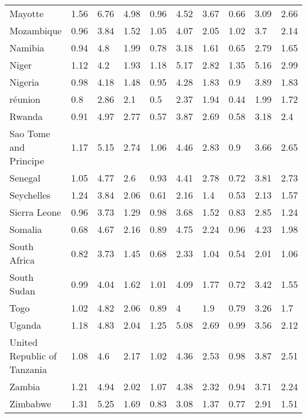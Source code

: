 \begin{longtable}[t]{llllllllll}
Mayotte & 1.56 & 6.76 & 4.98 & 0.96 & 4.52 & 3.67 & 0.66 & 3.09 & 2.66\\
Mozambique & 0.96 & 3.84 & 1.52 & 1.05 & 4.07 & 2.05 & 1.02 & 3.7 & 2.14\\
Namibia & 0.94 & 4.8 & 1.99 & 0.78 & 3.18 & 1.61 & 0.65 & 2.79 & 1.65\\
Niger & 1.12 & 4.2 & 1.93 & 1.18 & 5.17 & 2.82 & 1.35 & 5.16 & 2.99\\
Nigeria & 0.98 & 4.18 & 1.48 & 0.95 & 4.28 & 1.83 & 0.9 & 3.89 & 1.83\\
réunion & 0.8 & 2.86 & 2.1 & 0.5 & 2.37 & 1.94 & 0.44 & 1.99 & 1.72\\
Rwanda & 0.91 & 4.97 & 2.77 & 0.57 & 3.87 & 2.69 & 0.58 & 3.18 & 2.4\\
Sao Tome and Principe & 1.17 & 5.15 & 2.74 & 1.06 & 4.46 & 2.83 & 0.9 & 3.66 & 2.65\\
Senegal & 1.05 & 4.77 & 2.6 & 0.93 & 4.41 & 2.78 & 0.72 & 3.81 & 2.73\\
Seychelles & 1.24 & 3.84 & 2.06 & 0.61 & 2.16 & 1.4 & 0.53 & 2.13 & 1.57\\
Sierra Leone & 0.96 & 3.73 & 1.29 & 0.98 & 3.68 & 1.52 & 0.83 & 2.85 & 1.24\\
Somalia & 0.68 & 4.67 & 2.16 & 0.89 & 4.75 & 2.24 & 0.96 & 4.23 & 1.98\\
South Africa & 0.82 & 3.73 & 1.45 & 0.68 & 2.33 & 1.04 & 0.54 & 2.01 & 1.06\\
South Sudan & 0.99 & 4.04 & 1.62 & 1.01 & 4.09 & 1.77 & 0.72 & 3.42 & 1.55\\
Togo & 1.02 & 4.82 & 2.06 & 0.89 & 4 & 1.9 & 0.79 & 3.26 & 1.7\\
Uganda & 1.18 & 4.83 & 2.04 & 1.25 & 5.08 & 2.69 & 0.99 & 3.56 & 2.12\\
United Republic of Tanzania & 1.08 & 4.6 & 2.17 & 1.02 & 4.36 & 2.53 & 0.98 & 3.87 & 2.51\\
Zambia & 1.21 & 4.94 & 2.02 & 1.07 & 4.38 & 2.32 & 0.94 & 3.71 & 2.24\\
Zimbabwe & 1.31 & 5.25 & 1.69 & 0.83 & 3.08 & 1.37 & 0.77 & 2.91 & 1.51\\*
\end{longtable}
\endgroup{}
